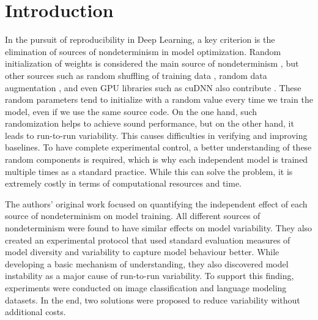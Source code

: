 \section{Introduction}
\label{sec:Introduction}
In the pursuit of reproducibility in Deep Learning, a key criterion is the elimination of sources of nondeterminism in model optimization. Random initialization of weights is considered the main source of nondeterminism \cite{zhuang:2021}, but other sources such as random shuffling of training data \cite{hartley:2020}, random data augmentation \cite{renard:2020}, and even GPU libraries such as cuDNN also contribute \cite{heumos:2021} . These random parameters tend to initialize with a random value every time we train the model, even if we use the same source code. On the one hand, such randomization helps to achieve sound performance, but on the other hand, it leads to run-to-run variability. This causes difficulties in verifying and improving baselines. To have complete experimental control, a better understanding of these random components is required, which is why each independent model is trained multiple times as a standard practice. While this can solve the problem, it is extremely costly in terms of computational resources and time.

The authors' original work focused on quantifying the independent effect of each source of nondeterminism on model training. All different sources of nondeterminism were found to have similar effects on model variability. They also created an experimental protocol that used standard evaluation measures of model diversity and variability to capture model behaviour better. While developing a basic mechanism of understanding, they also discovered model instability as a major cause of run-to-run variability. To support this finding, experiments were conducted on image classification and language modeling datasets. In the end, two solutions were proposed to reduce variability without additional costs.


